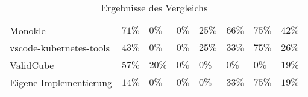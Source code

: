 \begin{table}[htp]
\begin{tabular}{llllllll}
        Monokle                 & $71\%$                      & $0\%$                       & $0\%$                       & $25\%$                      & $66\%$                      & $75\%$                      & $42\%$                 \\
        vscode-kubernetes-tools & $43\%$                      & $0\%$                       & $0\%$                       & $25\%$                      & $33\%$                      & $75\%$                      & $26\%$                 \\
        ValidCube               & $57\%$                      & $20\%$                      & $0\%$                       & $0\%$                       & $0\%$                       & $0\%$                       & $19\%$                 \\
        Eigene Implementierung  & $14\%$                      & $0\%$                       & $0\%$                       & $0\%$                       & $33\%$                      & $75\%$                      & $19\%$                 \\
        \bottomrule
    \end{tabular}
    \caption{Ergebnisse des Vergleichs}
    \label{tbl:kubernetes-manifest-tools-comparison}
\end{table}
